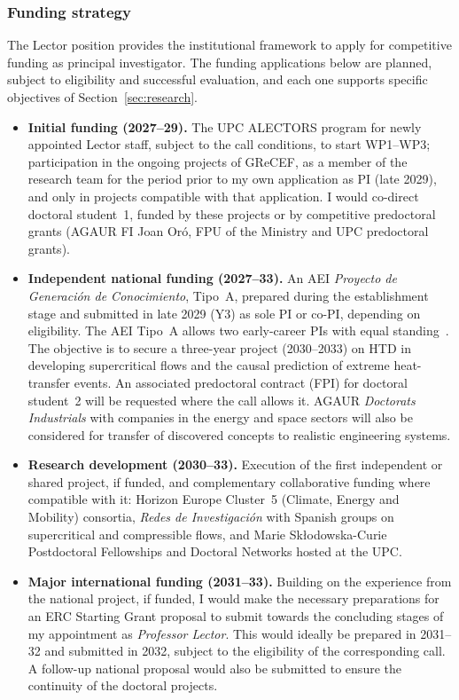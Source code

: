 \documentclass[11pt]{article}
\begin{document}
\subsubsection{Funding strategy}
The Lector position provides the institutional framework to
apply for competitive funding as principal investigator. 
The funding applications below are planned, subject to eligibility and successful evaluation, and each one supports specific objectives of Section~\ref{sec:research}.
\begin{itemize}
  \item \textbf{Initial funding (2027--29).} The UPC ALECTORS program for newly appointed Lector staff, subject to the call conditions, to start WP1--WP3; participation in the ongoing projects of GReCEF, as a member of the research team for the period prior to my own application as PI (late 2029), and only in projects compatible with that application. 
  I would co-direct doctoral student~1, funded by these projects or by competitive predoctoral grants (AGAUR FI Joan Or\'o, FPU of the Ministry and UPC predoctoral grants).
  
  \item \textbf{Independent national funding (2027--33).} An AEI \textit{Proyecto de Generaci\'on de Conocimiento}, Tipo~A, prepared during the establishment stage and submitted in late 2029 (Y3) as sole PI or co-PI, depending on eligibility. 
  The AEI Tipo~A allows two early-career PIs with equal standing~\cite{AEI2025}. 
  The objective is to secure a three-year project (2030--2033) on HTD in developing supercritical flows and the causal prediction of extreme heat-transfer events. 
  An associated predoctoral contract (FPI) for doctoral student~2 will be requested where the call allows it. 
  AGAUR \textit{Doctorats Industrials} with companies in the energy and space sectors will also be considered for transfer of discovered concepts to realistic engineering systems.
  
  \item \textbf{Research development (2030--33).} Execution of the first independent or shared project, if funded, and complementary collaborative funding where compatible with it: Horizon Europe Cluster~5 (Climate, Energy and Mobility) consortia, \textit{Redes de Investigaci\'on}   with Spanish groups on supercritical and compressible flows, and Marie Sk\l{}odowska-Curie Postdoctoral Fellowships and Doctoral Networks hosted at the UPC.
  
  \item \textbf{Major international funding (2031--33).} Building on the experience from the national project, if funded, I would make the necessary preparations for an ERC Starting Grant proposal to submit towards the concluding stages of my appointment as \textit{Professor Lector}. This would ideally be prepared in 2031--32 and submitted in 2032, subject to the eligibility of the corresponding call. A follow-up national proposal would also be submitted to ensure the continuity of the doctoral projects.
\end{itemize}
\end{document}

